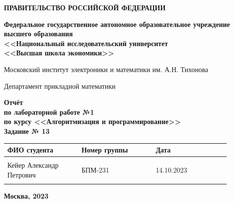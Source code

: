 \documentclass[12pt]{article}
\begin{document}
	
	\thispagestyle{empty}
	\begin{center}
		\textbf{ПРАВИТЕЛЬСТВО РОССИЙСКОЙ ФЕДЕРАЦИИ}
		
		\vspace{5ex}
		
		\textbf{Федеральное государственное автономное образовательное учреждение \\ высшего образования \\ <<Национальный исследовательский университет \\ <<Высшая школа экономики>>}
	\end{center}
	\vspace{5ex}
	
	\begin{center}
		Московский институт электроники и математики им. А.Н. Тихонова  
		
		\vspace{5ex}
		
		Департамент прикладной математики
		
		\vspace{10ex}
		\textbf{Отчёт \\ по лабораторной работе №1 \\ по курсу <<Алгоритмизация и программирование>> \\ Задание № 13}
		\vspace{7ex}
		
	\end{center}
	
	\begin{center} 
		\begin{tabular}{| p{0.3\linewidth}| p{0.3\linewidth}| p{0.3\linewidth}|}
			\hline	
			ФИО студента & Номер группы & Дата \\  \hline
			& & \\  
			Кейер Александр \newline Петрович & БПМ-231 & 14.10.2023\\  
			& & \\  \hline		
		\end{tabular}
	\end{center}
	
	\begin{center}
		\vspace{3ex}
		
		\vfill
		
		\normalsize
		
		\textbf{Москва, 2023}
	\end{center}
	
\end{document}
